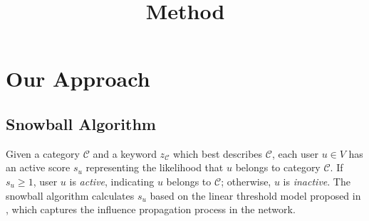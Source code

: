 \documentclass{article}
\begin{document}
\title{Method}

\newcommand{\following}{\ensuremath{following}}
\newcommand{\follower}{\ensuremath{follower}}

\maketitle \else \fi

\newcommand{\argmax}{\operatornamewithlimits{argmax}}

\section{Our Approach}\label{sec:method}

\subsection{Snowball Algorithm}

Given a category $\mathcal{C}$ and a keyword $z_{\mathcal{C}}$ which best describes $\mathcal{C}$, each user $u \in V$ has an active score $s_u$ representing the likelihood that $u$ belongs to category $\mathcal{C}$. If $s_u \geq 1$, user $u$ is \emph{active}, indicating $u$ belongs to $\mathcal{C}$; otherwise, $u$ is \emph{inactive}. The snowball algorithm calculates $s_u$ based on the linear threshold model proposed in \cite{snowball1,snowball2}, which captures the influence propagation process in the network.


\end{document}
